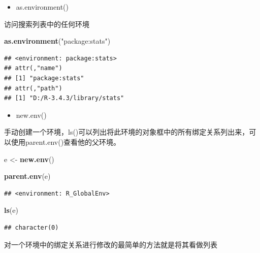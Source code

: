 \documentclass[]{book}
\newenvironment{Shaded}{\begin{snugshade}}{\end{snugshade}}
\newcommand{\KeywordTok}[1]{\textcolor[rgb]{0.13,0.29,0.53}{\textbf{#1}}}
\newcommand{\DecValTok}[1]{\textcolor[rgb]{0.00,0.00,0.81}{#1}}
\newcommand{\StringTok}[1]{\textcolor[rgb]{0.31,0.60,0.02}{#1}}
\newcommand{\OperatorTok}[1]{\textcolor[rgb]{0.81,0.36,0.00}{\textbf{#1}}}
\newcommand{\NormalTok}[1]{#1}
\providecommand{\tightlist}{%
  \setlength{\itemsep}{0pt}\setlength{\parskip}{0pt}}
\begin{document}
\begin{itemize}
\tightlist
\item
  as.environment()
\end{itemize}

访问搜索列表中的任何环境

\begin{Shaded}
\begin{Highlighting}[]
\KeywordTok{as.environment}\NormalTok{(}\StringTok{"package:stats"}\NormalTok{)}
\end{Highlighting}
\end{Shaded}

\begin{verbatim}
## <environment: package:stats>
## attr(,"name")
## [1] "package:stats"
## attr(,"path")
## [1] "D:/R-3.4.3/library/stats"
\end{verbatim}

\begin{itemize}
\tightlist
\item
  new.env()
\end{itemize}

手动创建一个环境，ls()可以列出将此环境的对象框中的所有绑定关系列出来，可以使用parent.env()查看他的父环境。

\begin{Shaded}
\begin{Highlighting}[]
\NormalTok{e <-}\StringTok{ }\KeywordTok{new.env}\NormalTok{()}

\KeywordTok{parent.env}\NormalTok{(e)}
\end{Highlighting}
\end{Shaded}

\begin{verbatim}
## <environment: R_GlobalEnv>
\end{verbatim}

\begin{Shaded}
\begin{Highlighting}[]
\KeywordTok{ls}\NormalTok{(e)}
\end{Highlighting}
\end{Shaded}

\begin{verbatim}
## character(0)
\end{verbatim}

对一个环境中的绑定关系进行修改的最简单的方法就是将其看做列表

\begin{Shaded}
\end{Shaded}
\end{document}
